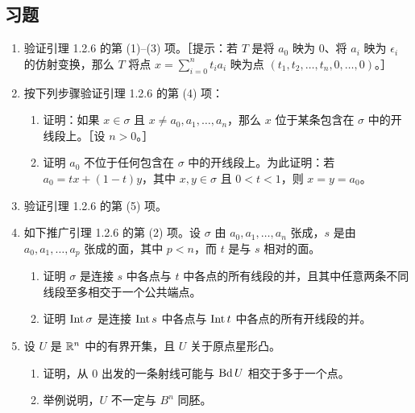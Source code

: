 \subsection*{习题}
\begin{enumerate}
\item 验证引理 1.2.6 的第 (1)--(3) 项。［提示：若 $T$ 是将 $a_0$ 映为 $0$、将 $a_i$ 映为 $\epsilon_i$ 的仿射变换，那么 $T$ 将点 $x=\sum_{i=0}^n t_i a_i$ 映为点 $(t_1,t_2,\ldots,t_n,0,\ldots,0)$。］
\item 按下列步骤验证引理 1.2.6 的第 (4) 项：
\begin{enumerate}[label=(\alph*)]
\item 证明：如果 $x\in\sigma$ 且 $x\ne a_0,a_1,\ldots,a_n$，那么 $x$ 位于某条包含在 $\sigma$ 中的开线段上。［设 $n>0$。］
\item 证明 $a_0$ 不位于任何包含在 $\sigma$ 中的开线段上。为此证明：若 $a_0=tx+(1-t)y$，其中 $x,y\in\sigma$ 且 $0<t<1$，则 $x=y=a_0$。
\end{enumerate}
\item 验证引理 1.2.6 的第 (5) 项。
\item 如下推广引理 1.2.6 的第 (2) 项。设 $\sigma$ 由 $a_0,a_1,\ldots,a_n$ 张成，$s$ 是由 $a_0,a_1,\ldots,a_p$ 张成的面，其中 $p<n$，而 $t$ 是与 $s$ 相对的面。
\begin{enumerate}[label=(\alph*)]
\item 证明 $\sigma$ 是连接 $s$ 中各点与 $t$ 中各点的所有线段的并，且其中任意两条不同线段至多相交于一个公共端点。
\item 证明 $\operatorname{Int}\sigma$ 是连接 $\operatorname{Int} s$ 中各点与 $\operatorname{Int} t$ 中各点的所有开线段的并。
\end{enumerate}
\item 设 $U$ 是 $\mathbb{R}^n$ 中的有界开集，且 $U$ 关于原点星形凸。
\begin{enumerate}[label=(\alph*)]
\item 证明，从 $0$ 出发的一条射线可能与 $\operatorname{Bd} U$ 相交于多于一个点。
\item[\textasteriskcentered\,(b)] 举例说明，$U$ 不一定与 $B^n$ 同胚。
\end{enumerate}
\end{enumerate}
